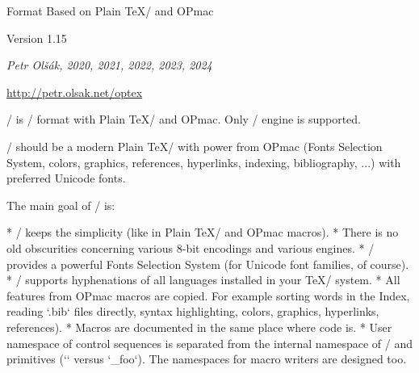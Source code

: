 

  \let\enddocument=\endinput

\typosize[10/12]  %

\begingroup \typosize [11/13.5] %



\centerline{\rm\OpTeX}
\vskip-8mm

\tit Format Based on Plain \TeX/ and OPmac

\hfill Version 1.15

\centerline{\it Petr Olšák, 2020, 2021, 2022, 2023, 2024}

\bigskip
\centerline{\url{http://petr.olsak.net/optex}}


\bigskip
\noindent
\OpTeX/ is \LuaTeX/ format with Plain \TeX/ and OPmac. Only \LuaTeX/ engine
is supported. 

\OpTeX/ should be a modern Plain \TeX/ with power from OPmac (Fonts
Selection System, colors, graphics, references, hyperlinks,
indexing, bibliography, ...) with preferred Unicode fonts.

The main goal of \OpTeX/ is:

\begitems
* \OpTeX/ keeps the simplicity (like in Plain \TeX/ and OPmac macros).
* There is no old obscurities concerning various 8-bit encodings and
  various engines.
* \OpTeX/ provides a powerful Fonts Selection System (for Unicode font
  families, of course).
* \OpTeX/ supports hyphenations of all languages installed in your \TeX/ system.
* All features from OPmac macros are copied. For example sorting words in
  the Index, reading `.bib` files directly, syntax 
  highlighting, colors, graphics, hyperlinks, references).
* Macros are documented in the same place where code is.
* User namespace of control sequences is separated from the internal namespace
  of \OpTeX/ and primitives (`\foo` versus `\_foo`).
  The namespaces for macro writers are designed too.
\enditems

